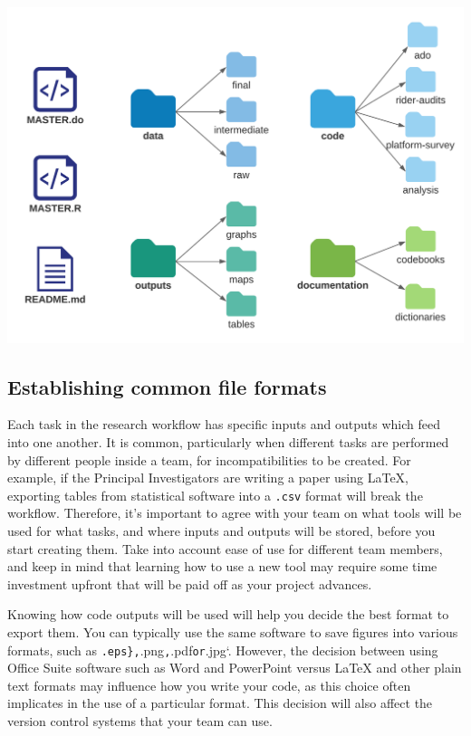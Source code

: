 \documentclass[
]{book}
\begin{document}
\begin{ex}
\includegraphics{examples/folder-structure.png}
\end{ex}

\hypertarget{establishing-common-file-formats}{%
\subsection*{Establishing common file formats}\label{establishing-common-file-formats}}

Each task in the research workflow has specific inputs and outputs
which feed into one another.
It is common, particularly when different tasks are performed by different people inside a team,
for incompatibilities to be created.
For example, if the Principal Investigators are writing a paper using LaTeX,
exporting tables from statistical software into a \texttt{.csv} format will break the workflow.
Therefore, it's important to agree with your team on what tools will be used for what tasks,
and where inputs and outputs will be stored, before you start creating them.
Take into account ease of use for different team members,
and keep in mind that learning how to use a new tool may require some time investment upfront that will be paid off as your project advances.

Knowing how code outputs will be used will help you decide the best format to export them.
You can typically use the same software to save figures into various formats,
such as \texttt{.eps\},}.png\texttt{,}.pdf\texttt{or}.jpg`.
However, the decision between using Office Suite software
such as Word and PowerPoint versus LaTeX and other plain text formats
may influence how you write your code,
as this choice often implicates in the use of a particular format.
This decision will also affect the version control systems that your team can use.
\end{document}
